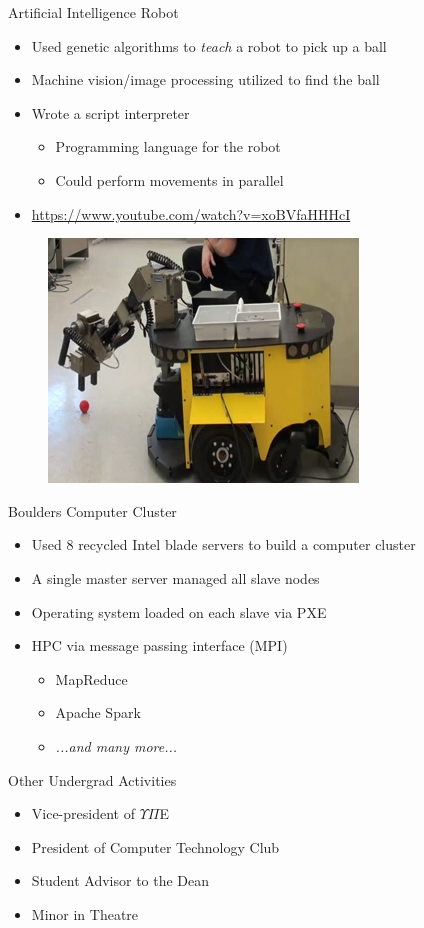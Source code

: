 \documentclass{beamer}
\begin{document}
\begin{frame}{Artificial Intelligence Robot}
\begin{itemize}
	\item Used genetic algorithms to \emph{teach} a robot to pick up a ball
	\item Machine vision/image processing utilized to find the ball
	\item Wrote a script interpreter
	\begin{itemize}
		\item Programming language for the robot
		\item Could perform movements in parallel
	\end{itemize}
	\item \url{https://www.youtube.com/watch?v=xoBVfaHHHcI}
\end{itemize}
\begin{figure}
	\includegraphics[width=.45\linewidth]{img/robot.png}
\end{figure}
\end{frame}

\begin{frame}{Boulders Computer Cluster}
\begin{itemize}
	\item Used 8 recycled Intel blade servers to build a computer cluster
	\item A single master server managed all slave nodes
	\item Operating system loaded on each slave via PXE
	\item HPC via message passing interface (MPI)
	\begin{itemize}
		\item MapReduce
		\item Apache Spark
		\item \emph{...and many more...}
	\end{itemize}
\end{itemize}
\end{frame}

\begin{frame}{Other Undergrad Activities}
\begin{itemize}
	\item Vice-president of $\Upsilon\Pi$E
	\item President of Computer Technology Club
	\item Student Advisor to the Dean
	\item Minor in Theatre
\end{itemize}
\end{frame}
\end{document}
